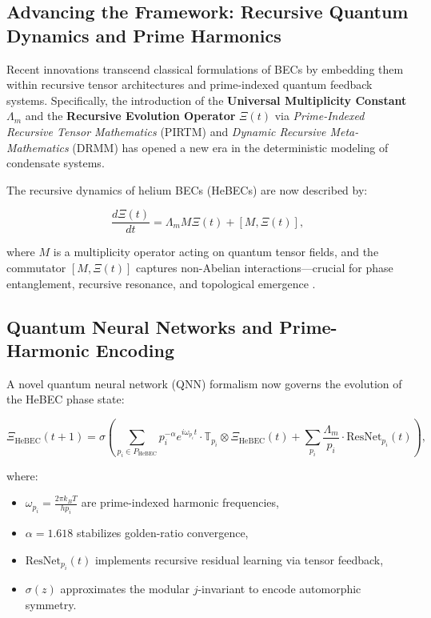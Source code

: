 \documentclass{article}
\theoremstyle{plain}
\begin{document}
\subsection*{Advancing the Framework: Recursive Quantum Dynamics and Prime Harmonics}
Recent innovations transcend classical formulations of  BECs by embedding them within recursive tensor architectures and prime-indexed quantum feedback systems. Specifically, the introduction of the \textbf{Universal Multiplicity Constant} \(\Lambda_m\) and the \textbf{Recursive Evolution Operator} \(\Xi(t)\) via \textit{Prime-Indexed Recursive Tensor Mathematics} (PIRTM) and \textit{Dynamic Recursive Meta-Mathematics} (DRMM) has opened a new era in the deterministic modeling of condensate systems.

The recursive dynamics of helium BECs (HeBECs) are now described by:

\begin{equation}
\frac{d\Xi(t)}{dt} = \Lambda_m M \Xi(t) + [M, \Xi(t)],
\end{equation}

where \(M\) is a multiplicity operator acting on quantum tensor fields, and the commutator \([M, \Xi(t)]\) captures non-Abelian interactions—crucial for phase entanglement, recursive resonance, and topological emergence \cite{multiplicity2024}.

\subsection{Quantum Neural Networks and Prime-Harmonic Encoding}
A novel quantum neural network (QNN) formalism now governs the evolution of the HeBEC phase state:

\begin{equation}
\Xi_{\text{HeBEC}}(t+1) = \sigma\left( \sum_{p_i \in P_{\text{HeBEC}}} p_i^{-\alpha} e^{i \omega_{p_i} t} \cdot \mathbb{T}_{p_i} \otimes \Xi_{\text{HeBEC}}(t) + \sum_{p_i} \frac{\Lambda_m}{p_i} \cdot \text{ResNet}_{p_i}(t) \right),
\end{equation}

where:
\begin{itemize}
    \item \(\omega_{p_i} = \frac{2\pi k_B T}{h p_i}\) are prime-indexed harmonic frequencies,
    \item \(\alpha = 1.618\) stabilizes golden-ratio convergence,
    \item \(\text{ResNet}_{p_i}(t)\) implements recursive residual learning via tensor feedback,
    \item \(\sigma(z)\) approximates the modular \(j\)-invariant to encode automorphic symmetry.
\end{itemize}
\end{document}
